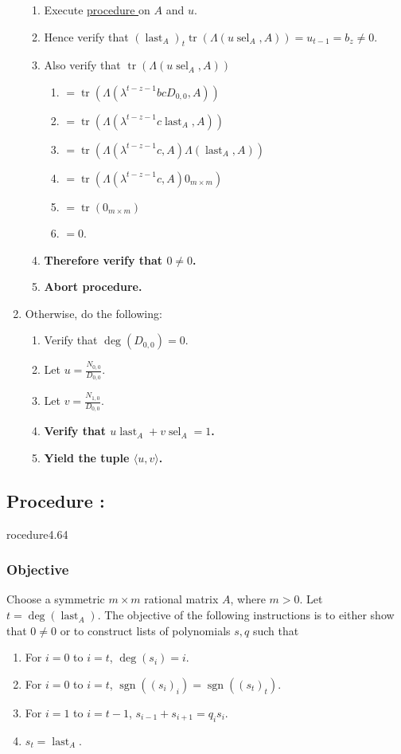 \documentclass{article}
\DeclareMathOperator{\sgn}{sgn}
\DeclareMathOperator{\tr}{tr}
\DeclareMathOperator{\sel}{sel}
\DeclareMathOperator{\last}{last}
\newcounter{procedure}[part]
\newcommand{\procedure}[1]{\subsection*{Procedure \thepart:\theprocedure}\label{sec:procedure #1}\global\expandafter\edef\csname procedure#1\endcsname{\thepart:\theprocedure}\addtocounter{procedure}{1}}
\newcommand{\objective}{\subsubsection*{Objective}}
\newcommand{\procedurehr}[1]{\hyperref[sec:procedure #1]{procedure \expandafter\csname procedure#1\endcsname}}
\begin{document}
\begin{multicols}{2}
\begin{enumerate}
\begin{enumerate}
						\item Execute \procedurehr{4.62} on $A$ and $u$.
						\item Hence verify that $(\last_A)_t\tr(\Lambda(u\sel_A,A))=u_{t-1}=b_z\ne 0$.
						\item Also verify that $\tr(\Lambda(u\sel_A,A))$
						\begin{enumerate}
							\item $=\tr(\Lambda(\lambda^{t-z-1}bcD_{0,0},A))$
							\item $=\tr(\Lambda(\lambda^{t-z-1}c\last_A,A))$
							\item $=\tr(\Lambda(\lambda^{t-z-1}c,A)\Lambda(\last_A,A))$
							\item $=\tr(\Lambda(\lambda^{t-z-1}c,A)0_{m\times m})$
							\item $=\tr(0_{m\times m})$
							\item $=0$.
						\end{enumerate}
						\item \textbf{Therefore verify that $0\ne 0$.}
						\item \textbf{Abort procedure.}
					\end{enumerate}
					\item Otherwise, do the following:
					\begin{enumerate}
						\item Verify that $\deg(D_{0,0})=0$.
						\item Let $u=\frac{N_{0,0}}{D_{0,0}}$.
						\item Let $v=\frac{N_{1,0}}{D_{0,0}}$.
						\item \textbf{Verify that $u\last_A+v\sel_A=1$.}
						\item \textbf{Yield the tuple $\langle u,v\rangle$.}
					\end{enumerate}
				\end{enumerate}
		\procedure{4.64}
			\objective
				Choose a symmetric $m\times m$ rational matrix $A$, where $m>0$. Let $t=\deg(\last_A)$. The objective of the following instructions is to either show that $0\ne 0$ or to construct lists of polynomials $s,q$ such that
				\begin{enumerate}
					\item For $i=0$ to $i=t$, $\deg(s_i)=i$.
					\item For $i=0$ to $i=t$, $\sgn((s_i)_i)=\sgn((s_t)_t)$.
					\item For $i=1$ to $i=t-1$, $s_{i-1}+s_{i+1}=q_is_i$.
					\item $s_t=\last_A$.
				\end{enumerate}

\end{multicols}
\end{document}
